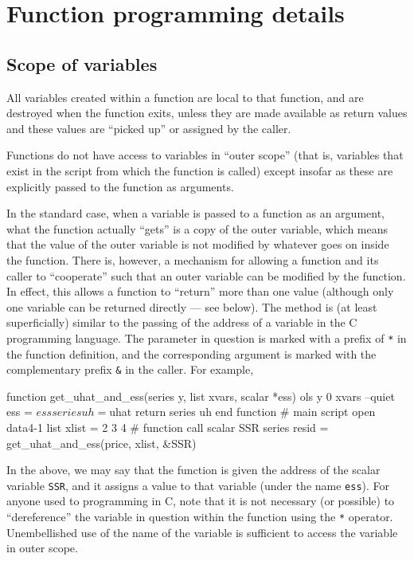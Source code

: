 \section{Function programming details}
\label{func-details}

\subsection{Scope of variables}

All variables created within a function are local to that function,
and are destroyed when the function exits, unless they are made
available as return values and these values are ``picked up'' or
assigned by the caller.
    
Functions do not have access to variables in ``outer scope'' (that is,
variables that exist in the script from which the function is called)
except insofar as these are explicitly passed to the function as
arguments.  

In the standard case, when a variable is passed to a function as an
argument, what the function actually ``gets'' is a copy of the outer
variable, which means that the value of the outer variable is not
modified by whatever goes on inside the function.  There is, however,
a mechanism for allowing a function and its caller to ``cooperate''
such that an outer variable can be modified by the function.  In
effect, this allows a function to ``return'' more than one value
(although only one variable can be returned directly --- see below).
The method is (at least superficially) similar to the passing of the
address of a variable in the C programming language.  The parameter in
question is marked with a prefix of \texttt{*} in the function
definition, and the corresponding argument is marked with the
complementary prefix \verb+&+ in the caller.  For example,
%
\begin{code}
      function get_uhat_and_ess(series y, list xvars, scalar *ess)
        ols y 0 xvars --quiet
        ess = $ess
        series uh = $uhat
        return series uh
      end function
      # main script
      open data4-1
      list xlist = 2 3 4
      # function call
      scalar SSR
      series resid = get_uhat_and_ess(price, xlist, &SSR)
\end{code}
%
In the above, we may say that the function is given the address of
the scalar variable \texttt{SSR}, and it assigns a value to that
variable (under the name \texttt{ess}).  For anyone used to
programming in C, note that it is not necessary (or possible) to
``dereference'' the variable in question within the function using the 
\texttt{*} operator.  Unembellished use of the name of the variable is
sufficient to access the variable in outer scope.

